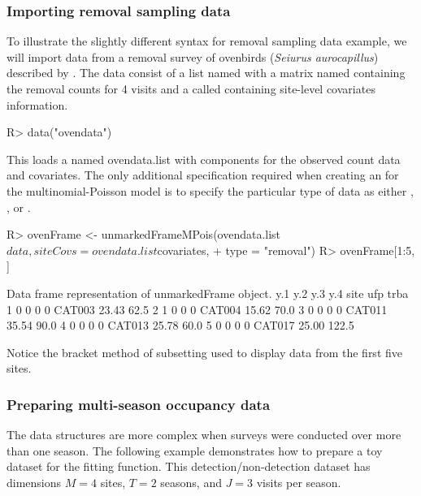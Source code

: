 \documentclass[article,shortnames]{jss}
\begin{document}
{\subsubsection{Importing removal sampling data}

To illustrate the slightly different syntax for removal sampling data example,
we will import data from a removal survey of ovenbirds
({\it Seiurus aurocapillus}) described by \citet{Royle2004a}.  The data consist
of a list named  with
a matrix named  containing the removal counts for 4 visits and a
 called  containing site-level covariates
information.

\begin{Schunk}
\begin{Sinput}
R> data("ovendata")
\end{Sinput}
\end{Schunk}

This loads a  named ovendata.list with components for the
observed count data and covariates.  The only additional specification
required when creating an  for the multinomial-Poisson
model is to specify the particular type of data as either
, , or .

\begin{Schunk}
\begin{Sinput}
R> ovenFrame <- unmarkedFrameMPois(ovendata.list$data, siteCovs = ovendata.list$covariates, 
+     type = "removal")
R> ovenFrame[1:5, ]
\end{Sinput}
\begin{Soutput}
Data frame representation of unmarkedFrame object.
  y.1 y.2 y.3 y.4   site   ufp  trba
1   0   0   0   0 CAT003 23.43  62.5
2   1   0   0   0 CAT004 15.62  70.0
3   0   0   0   0 CAT011 35.54  90.0
4   0   0   0   0 CAT013 25.78  60.0
5   0   0   0   0 CAT017 25.00 122.5
\end{Soutput}
\end{Schunk}

Notice the bracket method of subsetting used to display data from the first
five sites.

\subsubsection{Preparing multi-season occupancy data}

The data structures are more complex when surveys were conducted over more
than one season. The following example demonstrates how to prepare a toy
dataset for the  fitting function. This detection/non-detection
dataset has dimensions $M=4$ sites, $T=2$ seasons, and $J=3$ visits per season.


}
\end{document}
